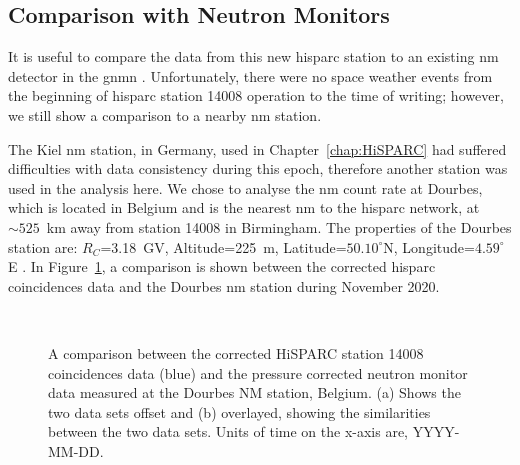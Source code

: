\subsection{Comparison with Neutron Monitors}\label{sec:HS_14008_vs_Kiel}

It is useful to compare the data from this new \gls{hisparc} station to an existing \gls{nm} detector in the \gls{gnmn} \citep{mishev_current_2020}. Unfortunately, there were no space weather events from the beginning of \gls{hisparc} station 14008 operation to the time of writing; however, we still show a comparison to a nearby \gls{nm} station. %

The Kiel \gls{nm} station, in Germany, used in Chapter~\ref{chap:HiSPARC} had suffered difficulties with data consistency during this epoch, therefore another station was used in the analysis here. We chose to analyse the \gls{nm} count rate at Dourbes, which is located in Belgium and is the nearest \gls{nm} to the \gls{hisparc} network, at $\sim 525$~km away from station 14008 in Birmingham. The properties of the Dourbes station are: $R_C$=3.18~GV, Altitude=225~m, Latitude=$50.10^{\circ}$N, Longitude=$4.59^{\circ}$E \citep{nmdb_nmdb_nodate}. In Figure~\ref{fig:14008_vs_DRBS}, a comparison is shown between the corrected \gls{hisparc} coincidences data and the Dourbes \gls{nm} station during November 2020.

\begin{figure}[ht!]
	\centering
	 \\

	
	\caption{A comparison between the corrected HiSPARC station 14008 coincidences data (blue) and the pressure corrected neutron monitor data measured at the Dourbes NM station, Belgium. (a) Shows the two data sets offset and (b) overlayed, showing the similarities between the two data sets. Units of time on the x-axis are, YYYY-MM-DD.}
	\label{fig:14008_vs_DRBS}
\end{figure}


